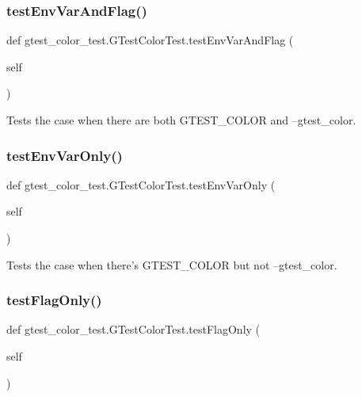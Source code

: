 \subsubsection{\texorpdfstring{test\+Env\+Var\+And\+Flag()}{testEnvVarAndFlag()}}
{\footnotesize\ttfamily def gtest\+\_\+color\+\_\+test.\+G\+Test\+Color\+Test.\+test\+Env\+Var\+And\+Flag (\begin{DoxyParamCaption}\item[{}]{self }\end{DoxyParamCaption})}

\begin{DoxyVerb}Tests the case when there are both GTEST_COLOR and --gtest_color.\end{DoxyVerb}
 \mbox{\label{classgtest__color__test_1_1_g_test_color_test_aedb7bbaa0d6acff3628d91a471f4ceb5}} 
\subsubsection{\texorpdfstring{test\+Env\+Var\+Only()}{testEnvVarOnly()}}
{\footnotesize\ttfamily def gtest\+\_\+color\+\_\+test.\+G\+Test\+Color\+Test.\+test\+Env\+Var\+Only (\begin{DoxyParamCaption}\item[{}]{self }\end{DoxyParamCaption})}

\begin{DoxyVerb}Tests the case when there's GTEST_COLOR but not --gtest_color.\end{DoxyVerb}
 \mbox{\label{classgtest__color__test_1_1_g_test_color_test_abc4c056b8e703e83516f9e5aea8dd25d}} 
\subsubsection{\texorpdfstring{test\+Flag\+Only()}{testFlagOnly()}}
{\footnotesize\ttfamily def gtest\+\_\+color\+\_\+test.\+G\+Test\+Color\+Test.\+test\+Flag\+Only (\begin{DoxyParamCaption}\item[{}]{self }\end{DoxyParamCaption})}

